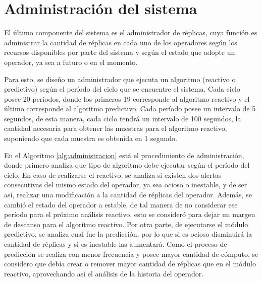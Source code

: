 \section{Administración del sistema}

El último componente del sistema es el administrador de réplicas, cuya función es administrar la cantidad de réplicas en cada uno de los operadores según los recursos disponibles por parte del sistema y según el estado que adopte un operador, ya sea a futuro o en el momento.

Para esto, se diseño un administrador que ejecuta un algoritmo (reactivo o predictivo) según el período del ciclo que se encuentre el sistema. Cada ciclo posee 20 períodos, donde los primeros 19 corresponde al algoritmo reactivo y el último corresponde al algoritmo predictivo. Cada período posee un intervalo de 5 segundos, de esta manera, cada ciclo tendrá un intervalo de 100 segundos, la cantidad necesaria para obtener las muestras para el algoritmo reactivo, suponiendo que cada muestra es obtenida en 1 segundo.

En el Algoritmo \ref{alg:administracion} está el procedimiento de administración, donde primero analiza que tipo de algoritmo debe ejecutar según el período del ciclo. En caso de realizarse el reactivo, se analiza si existen dos alertas consecutivas del mismo estado del operador, ya sea ocioso o inestable, y de ser así, realizar una modificación a la cantidad de réplicas del operador. Además, se cambió el estado del operador a estable, de tal manera de no considerar ese período para el próximo análisis reactivo, esto se consideró para dejar un margen de descanso para el algoritmo reactivo. Por otra parte, de ejecutarse el módulo predictivo, se analiza cual fue la predicción, por lo que si es ocioso disminuirá la cantidad de réplicas y si es inestable las aumentará. Como el proceso de predicción se realiza con menor frecuencia y posee mayor cantidad de cómputo, se considero que debía crear o remover mayor cantidad de réplicas que en el módulo reactivo, aprovechando así el análisis de la historia del operador.

